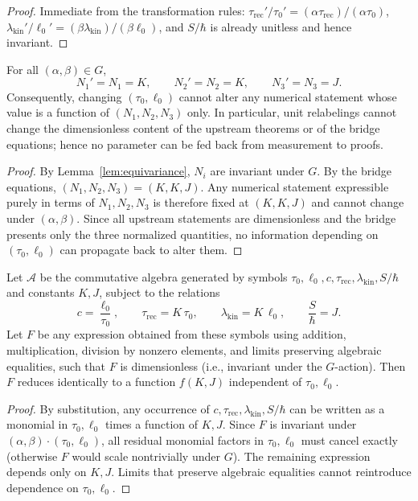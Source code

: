 \documentclass[11pt]{article}
\begin{document}
\begin{proof}
Immediate from the transformation rules: \(\tau_{\mathrm{rec}}'/\tau_{0}'=(\alpha\tau_{\mathrm{rec}})/(\alpha\tau_{0})\), \(\lambda_{\mathrm{kin}}'/\ell_{0}'=(\beta\lambda_{\mathrm{kin}})/(\beta\ell_{0})\), and \(S/\hbar\) is already unitless and hence invariant.
\end{proof}

\begin{theorem}\label{thm:nocirc}
For all \((\alpha,\beta)\in G\),
\[
N_{1}'=N_{1}=K,\qquad N_{2}'=N_{2}=K,\qquad N_{3}'=N_{3}=J.
\]
Consequently, changing \((\tau_{0},\ell_{0})\) cannot alter any numerical statement whose value is a function of \((N_{1},N_{2},N_{3})\) only. In particular, unit relabelings cannot change the dimensionless content of the upstream theorems or of the bridge equations; hence no parameter can be fed back from measurement to proofs.
\end{theorem}

\begin{proof}
By Lemma~\ref{lem:equivariance}, \(N_{i}\) are invariant under \(G\). By the bridge equations, \((N_{1},N_{2},N_{3})=(K,K,J)\). Any numerical statement expressible purely in terms of \(N_{1},N_{2},N_{3}\) is therefore fixed at \((K,K,J)\) and cannot change under \((\alpha,\beta)\). Since all upstream statements are dimensionless and the bridge presents only the three normalized quantities, no information depending on \((\tau_{0},\ell_{0})\) can propagate back to alter them.
\end{proof}

\begin{lemma}\label{lem:elimination}
Let \(\mathcal{A}\) be the commutative algebra generated by symbols \(\tau_{0},\ell_{0},c,\tau_{\mathrm{rec}},\lambda_{\mathrm{kin}},S/\hbar\) and constants \(K,J\), subject to the relations
\[
c=\frac{\ell_{0}}{\tau_{0}},\qquad \tau_{\mathrm{rec}}=K\,\tau_{0},\qquad \lambda_{\mathrm{kin}}=K\,\ell_{0},\qquad \frac{S}{\hbar}=J.
\]
Let \(F\) be any expression obtained from these symbols using addition, multiplication, division by nonzero elements, and limits preserving algebraic equalities, such that \(F\) is dimensionless (i.e., invariant under the \(G\)-action). Then \(F\) reduces identically to a function \(f(K,J)\) independent of \(\tau_{0},\ell_{0}\).
\end{lemma}

\begin{proof}
By substitution, any occurrence of \(c,\tau_{\mathrm{rec}},\lambda_{\mathrm{kin}},S/\hbar\) can be written as a monomial in \(\tau_{0},\ell_{0}\) times a function of \(K,J\). Since \(F\) is invariant under \((\alpha,\beta)\cdot(\tau_{0},\ell_{0})\), all residual monomial factors in \(\tau_{0},\ell_{0}\) must cancel exactly (otherwise \(F\) would scale nontrivially under \(G\)). The remaining expression depends only on \(K,J\). Limits that preserve algebraic equalities cannot reintroduce dependence on \(\tau_{0},\ell_{0}\).
\end{proof}
\end{document}

